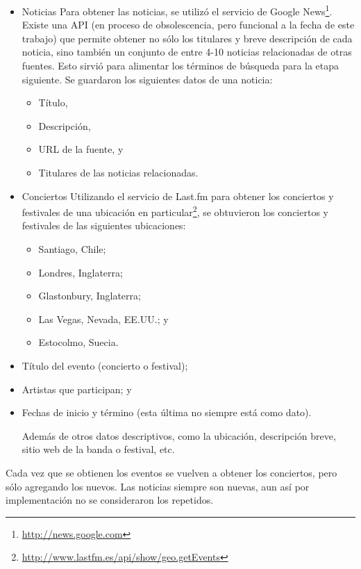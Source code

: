 \documentclass[upright, contnum]{umemoria}
\begin{document}
\begin{itemize}
\item Noticias
  Para obtener las noticias, se utilizó el servicio de Google
  News\footnote{\href{http://news.google.com}{http://news.google.com} }. Existe una API (en proceso de
  obsolescencia, pero funcional a la fecha de este trabajo) que permite
  obtener no sólo los titulares y breve descripción de cada noticia,
  sino también un conjunto de entre 4-10 noticias relacionadas de otras
  fuentes. Esto sirvió para alimentar los términos de búsqueda para la
  etapa siguiente. Se guardaron los siguientes datos de una noticia:

\begin{itemize}
\item Título,
\item Descripción,
\item URL de la fuente, y
\item Titulares de las noticias relacionadas.
\end{itemize}

\item Conciertos
  Utilizando el servicio de Last.fm para obtener los conciertos y
  festivales de una ubicación en
  particular\footnote{\href{http://www.lastfm.es/api/show/geo.getEvents}{http://www.lastfm.es/api/show/geo.getEvents} }, se
  obtuvieron los conciertos y festivales de las siguientes
  ubicaciones:

\begin{itemize}
\item Santiago, Chile;
\item Londres, Inglaterra;
\item Glastonbury, Inglaterra;
\item Las Vegas, Nevada, EE.UU.; y
\item Estocolmo, Suecia.
\end{itemize}

\item Título del evento (concierto o festival);
\item Artistas que participan; y
\item Fechas de inicio y término (esta última no siempre está como
    dato).

  Además de otros datos descriptivos, como la ubicación, descripción
  breve, sitio web de la banda o festival, etc.
\end{itemize}
Cada vez que se obtienen los eventos se vuelven a obtener los
conciertos, pero sólo agregando los nuevos. Las noticias siempre son
nuevas, aun así por implementación no se consideraron los repetidos.
  
\end{document}
